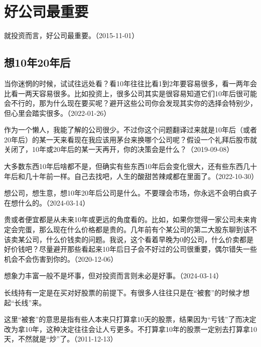 
\section{好公司最重要}

就投资而言，好公司最重要。（2015-11-01）

\subsection{想10年20年后}

当你迷惘的时候，试试往远处看？看10年往往比看1到2年要容易很多，看一两年会比看一两天容易很多。比如投资上，很多公司其实是很容易知道它们10年后很可能会不行的，那为什么现在要买呢？避开这些公司你会发现其实你的选择会特别少，但心里会踏实很多。（2022-01-26）


作为一个懒人，我能了解的公司很少。不过你这个问题翻译过来就是10年后（或者20年后）的某一天来看现在我应该用茅台来换哪个公司呢？假设一个礼拜后股市就关闭了，10年或20年后的某一天再开，你的决策会是什么？（2019-09-08）

大多数东西10年后啥都不是，但确实有些东西10年后会变化很大，还有些东西几十年后和几十年前一样。自己去找吧，人生的酸甜苦辣咸都在里面了。（2022-10-30）


想公司，想生意，想10年20年后公司是什么。不要理会市场，你永远不会明白疯子在想什么的。（2024-03-14）

贵或者便宜都是从未来10年或更远的角度看的。比如，如果你觉得一家公司未来肯定会完蛋，那么现在什么价格都是贵的。几年前有个某公司的第二大股东聊到该不该卖某公司，什么价钱卖的问题。我说，这个看着早晚为0的公司，什么价卖都是好价钱吧？尽量避开那些看起来10年后日子会不好过的公司很重要，偶尔错失一些机会不会伤害到你的。（2020-12-06）


想象力丰富一般不是坏事，但对投资而言则未必是好事。（2024-03-14）

长线持有一定是在买对好股票的前提下。有很多人往往只是在“被套”的时候才想起“长线”来。

这里“被套”的意思是指有些人本来只打算拿10天的股票，结果因为“亏钱”了而决定改为拿10年，这种决定往往会让人亏更多。不打算拿10年的股票一定别去打算拿10天，不然就是“炒”了。（2011-12-13）

